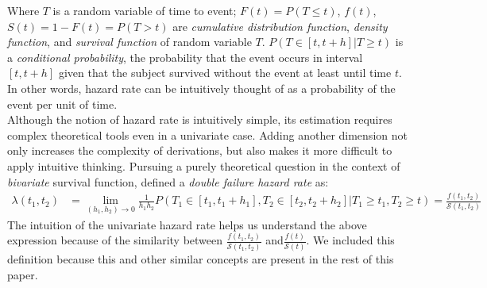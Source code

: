 \documentclass[]{article}
\begin{document}
Where $T$ is a random variable of time to event; $F(t)=P(T\leq t)$, $f(t)$, $S(t)= 1-F(t) = P(T>t)$ are \emph{cumulative distribution function}, \emph{density function}, and \emph{survival function} of random variable $T$. $P(T\in[t,t+h] | T\geq t)$ is a \emph{conditional probability}, the probability that the event occurs in interval $[t,t+h]$ given that the subject survived without the event at least until time $t$. In other words, hazard rate can be intuitively thought of as a probability of the event per unit of time.\\
Although the notion of hazard rate is intuitively simple, its estimation requires complex theoretical tools even in a univariate case. Adding another dimension not only increases the complexity of derivations, but also makes it more difficult to apply intuitive thinking. Pursuing a purely theoretical question in the context of \emph{bivariate} survival function, \cite{basu1971bivariate} %
defined a \emph{double failure hazard rate} as:
$$
\begin{aligned}
	\lambda(t_1,t_2)&= \lim_{(h_1,h_2)\rightarrow 0} \frac{1}{h_1 h_2} P(T_1\in[t_1,t_1+h_1], T_2\in[t_2,t_2+h_2] | T_1\geq t_1, T_2 \geq t)=
	 \frac{f(t_1,t_2)}{\mathcal{S}(t_1,t_2)}
\end{aligned}
$$
The intuition of the univariate hazard rate helps us understand the above expression because of the similarity between $\frac{f(t_1,t_2)}{\mathcal{S}(t_1,t_2)}$ and$\frac{f(t)}{\mathcal{S}(t)}$. We included this definition because this and other similar concepts are present in the rest of this paper.\\
\end{document}

